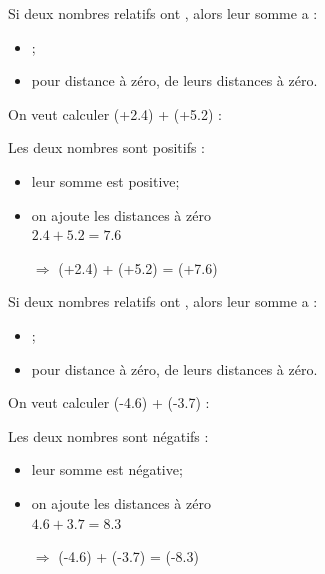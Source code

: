 \documentclass[xcolor={dvipsnames}]{beamer}
\begin{document}
\begin{frame}
	\begin{myprop}
		Si deux nombres relatifs ont , alors leur somme a :\pause
		\begin{itemize}
			\item {};\pause
			\item pour distance à zéro, \pause {} de leurs distances à zéro.\pause
		\end{itemize}
	\end{myprop}


	\begin{myex}
		On veut calculer (+\num{2.4}) + (+\num{5.2}) : \pause
		
		Les deux nombres sont positifs :\pause
		\begin{itemize}
			\item leur somme est positive;\pause
			\item on ajoute les distances à zéro \\ $\num{2.4} + \num{5.2} = \num{7.6}$ \pause
			\item[$\Rightarrow$] (+\num{2.4}) + (+\num{5.2}) = \pause (+\num{7.6})
		\end{itemize}
	\end{myex}
\end{frame}


\begin{frame}
	\begin{myprop}
		Si deux nombres relatifs ont , alors leur somme a :
		\begin{itemize}
			\item \kword{le même signe};
			\item pour distance à zéro,   de leurs distances à zéro. 
		\end{itemize}
	\end{myprop}
	
	
	\begin{myex}
		On veut calculer (-\num{4.6}) + (-\num{3.7}) :
		
		Les deux nombres sont négatifs :\pause
		\begin{itemize}
			\item leur somme est négative;\pause
			\item on ajoute les distances à zéro \\ $\num{4.6} + \num{3.7} = \num{8.3}$ \pause
			\item[$\Rightarrow$] (-\num{4.6}) + (-\num{3.7}) = \pause (-\num{8.3})
		\end{itemize}
	\end{myex}
\end{frame}
\end{document}
